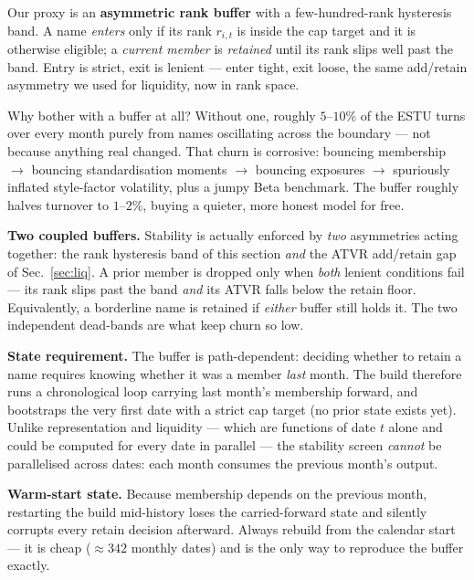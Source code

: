 \documentclass[11pt]{article}
\theoremstyle{definition}
\theoremstyle{plain}
\theoremstyle{remark}
\begin{document}
Our proxy is an \textbf{asymmetric rank buffer} with a few-hundred-rank hysteresis band. A name \emph{enters} only if its rank $r_{i,t}$ is inside the cap target and it is otherwise eligible; a \emph{current member} is \emph{retained} until its rank slips well past the band. Entry is strict, exit is lenient --- enter tight, exit loose, the same add/retain asymmetry we used for liquidity, now in rank space.

\begin{intuition}
Why bother with a buffer at all? Without one, roughly $5$--$10\%$ of the ESTU turns over every month purely from names oscillating across the boundary --- not because anything real changed. That churn is corrosive: bouncing membership $\to$ bouncing standardisation moments $\to$ bouncing exposures $\to$ spuriously inflated style-factor volatility, plus a jumpy Beta benchmark. The buffer roughly halves turnover to $1$--$2\%$, buying a quieter, more honest model for free.
\end{intuition}

\textbf{Two coupled buffers.} Stability is actually enforced by \emph{two} asymmetries acting together: the rank hysteresis band of this section \emph{and} the ATVR add/retain gap of Sec.\ \ref{sec:liq}. A prior member is dropped only when \emph{both} lenient conditions fail --- its rank slips past the band \emph{and} its ATVR falls below the retain floor. Equivalently, a borderline name is retained if \emph{either} buffer still holds it. The two independent dead-bands are what keep churn so low.

\textbf{State requirement.} The buffer is path-dependent: deciding whether to retain a name requires knowing whether it was a member \emph{last} month. The build therefore runs a chronological loop carrying last month's membership forward, and bootstraps the very first date with a strict cap target (no prior state exists yet). Unlike representation and liquidity --- which are functions of date $t$ alone and could be computed for every date in parallel --- the stability screen \emph{cannot} be parallelised across dates: each month consumes the previous month's output.

\begin{pitfall}
\textbf{Warm-start state.} Because membership depends on the previous month, restarting the build mid-history loses the carried-forward state and silently corrupts every retain decision afterward. Always rebuild from the calendar start --- it is cheap ($\approx 342$ monthly dates) and is the only way to reproduce the buffer exactly.
\end{pitfall}
\end{document}
